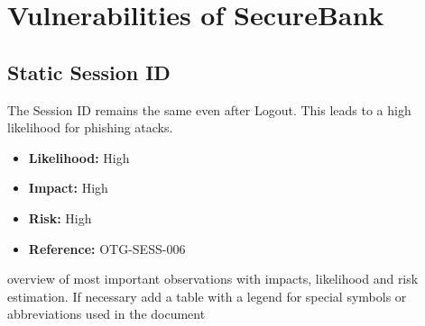 \section{Vulnerabilities of SecureBank}
\subsection{Static Session ID}
The Session ID remains the same even after Logout.
This leads to a high likelihood for phishing atacks.
\begin{itemize}
	\item \textbf{Likelihood:} High
	\item \textbf{Impact:} High
	\item \textbf{Risk:} High
	\item \textbf{Reference:} OTG-SESS-006
\end{itemize}
overview of most important observations with impacts, likelihood and risk
estimation. If necessary add a table with a legend for special symbols or abbreviations used in the document
